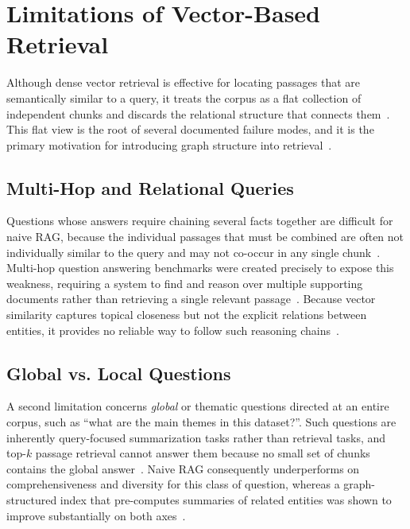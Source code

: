 \section{Limitations of Vector-Based Retrieval}
\label{sec:gr-vector-limitations}

Although dense vector retrieval is effective for locating passages that are
semantically similar to a query, it treats the corpus as a flat collection of
independent chunks and discards the relational structure that connects
them~\cite{peng2024graphrag}. This flat view is the root of several documented
failure modes, and it is the primary motivation for introducing graph structure
into retrieval~\cite{peng2024graphrag, edge2024graphrag}.

\subsection{Multi-Hop and Relational Queries}

Questions whose answers require chaining several facts together are difficult for
naive RAG, because the individual passages that must be combined are often not
individually similar to the query and may not co-occur in any single
chunk~\cite{peng2024graphrag}. Multi-hop question answering benchmarks were
created precisely to expose this weakness, requiring a system to find and reason
over multiple supporting documents rather than retrieving a single relevant
passage~\cite{yang2018hotpotqa}. Because vector similarity captures topical
closeness but not the explicit relations between entities, it provides no
reliable way to follow such reasoning chains~\cite{peng2024graphrag}.

\subsection{Global vs. Local Questions}

A second limitation concerns \emph{global} or thematic questions directed at an
entire corpus, such as ``what are the main themes in this dataset?''.
Such questions are inherently query-focused summarization tasks rather than
retrieval tasks, and top-$k$ passage retrieval cannot answer them because no
small set of chunks contains the global answer~\cite{edge2024graphrag}. Naive RAG
consequently underperforms on comprehensiveness and diversity for this class of
question, whereas a graph-structured index that pre-computes summaries of related
entities was shown to improve substantially on both
axes~\cite{edge2024graphrag}.
